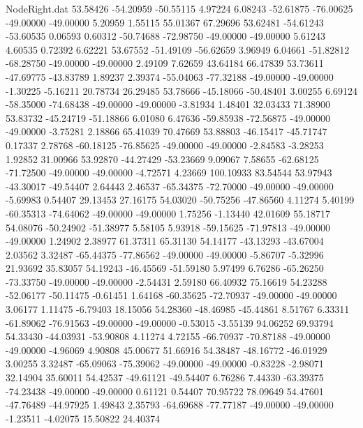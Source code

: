 \begin{filecontents}{NodeRight.dat}
  53.58426  -54.20959  -50.55115     4.97224    6.08243  -52.61875  -76.00625  -49.00000  -49.00000    5.20959    1.55115   55.01367   67.29696
  53.62481  -54.61243  -53.60535     0.06593    0.60312  -50.74688  -72.98750  -49.00000  -49.00000    5.61243    4.60535    0.72392    6.62221
  53.67552  -51.49109  -56.62659     3.96949    6.04661  -51.82812  -68.28750  -49.00000  -49.00000    2.49109    7.62659   43.64184   66.47839
  53.73611  -47.69775  -43.83789     1.89237    2.39374  -55.04063  -77.32188  -49.00000  -49.00000   -1.30225   -5.16211   20.78734   26.29485
  53.78666  -45.18066  -50.48401     3.00255    6.69124  -58.35000  -74.68438  -49.00000  -49.00000   -3.81934    1.48401   32.03433   71.38900
  53.83732  -45.24719  -51.18866     6.01080    6.47636  -59.85938  -72.56875  -49.00000  -49.00000   -3.75281    2.18866   65.41039   70.47669
  53.88803  -46.15417  -45.71747     0.17337    2.78768  -60.18125  -76.85625  -49.00000  -49.00000   -2.84583   -3.28253    1.92852   31.00966
  53.92870  -44.27429  -53.23669     9.09067    7.58655  -62.68125  -71.72500  -49.00000  -49.00000   -4.72571    4.23669  100.10933   83.54544
  53.97943  -43.30017  -49.54407     2.64443    2.46537  -65.34375  -72.70000  -49.00000  -49.00000   -5.69983    0.54407   29.13453   27.16175
  54.03020  -50.75256  -47.86560     4.11274    5.40199  -60.35313  -74.64062  -49.00000  -49.00000    1.75256   -1.13440   42.01609   55.18717
  54.08076  -50.24902  -51.38977     5.58105    5.93918  -59.15625  -71.97813  -49.00000  -49.00000    1.24902    2.38977   61.37311   65.31130
  54.14177  -43.13293  -43.67004     2.03562    3.32487  -65.44375  -77.86562  -49.00000  -49.00000   -5.86707   -5.32996   21.93692   35.83057
  54.19243  -46.45569  -51.59180     5.97499    6.76286  -65.26250  -73.33750  -49.00000  -49.00000   -2.54431    2.59180   66.40932   75.16619
  54.23288  -52.06177  -50.11475    -0.61451    1.64168  -60.35625  -72.70937  -49.00000  -49.00000    3.06177    1.11475   -6.79403   18.15056
  54.28360  -48.46985  -45.44861     8.51767    6.33311  -61.89062  -76.91563  -49.00000  -49.00000   -0.53015   -3.55139   94.06252   69.93794
  54.33430  -44.03931  -53.90808     4.11274    4.72155  -66.70937  -70.87188  -49.00000  -49.00000   -4.96069    4.90808   45.00677   51.66916
  54.38487  -48.16772  -46.01929     3.00255    3.32487  -65.09063  -75.39062  -49.00000  -49.00000   -0.83228   -2.98071   32.14904   35.60011
  54.42537  -49.61121  -49.54407     6.76286    7.44330  -63.39375  -74.23438  -49.00000  -49.00000    0.61121    0.54407   70.95722   78.09649
  54.47601  -47.76489  -44.97925     1.49843    2.35793  -64.69688  -77.77187  -49.00000  -49.00000   -1.23511   -4.02075   15.50822   24.40374

\end{filecontents}
